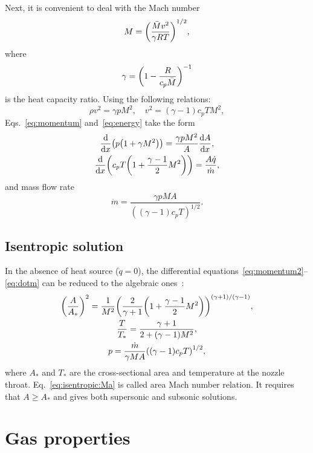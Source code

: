 \documentclass{article}
\begin{document}
Next, it is convenient to deal with the Mach number
\begin{equation}\label{eq:Mach}
    M = \qty(\frac{\bar{M}v^2}{\gamma RT})^{1/2},
\end{equation}
where
\begin{equation}\label{eq:gamma}
    \gamma = \qty(1-\frac{R}{c_p\bar{M}})^{-1}
\end{equation}
is the heat capacity ratio.
Using the following relations:
\begin{equation*}
    \rho v^2 = \gamma p M^2, \quad v^2 = (\gamma-1)c_pT M^2,
\end{equation*}
Eqs.~\eqref{eq:momentum} and~\eqref{eq:energy} take the form
\begin{gather}
    \dv{x}(p\qty(1 + \gamma M^2)) = \frac{\gamma p M^2}{A}\dv{A}{x}, \label{eq:momentum2}\\
    \dv{x}(c_pT\qty(1 + \frac{\gamma-1}{2}M^2)) = \frac{A\dot{q}}{\dot{m}}, \label{eq:energy2}
\end{gather}
and mass flow rate
\begin{equation}\label{eq:dotm}
    \dot{m} = \frac{\gamma pMA}{((\gamma-1)c_pT)^{1/2}}.
\end{equation}

\subsection{Isentropic solution}

In the absence of heat source ($\dot{q}=0$), the differential equations~\eqref{eq:momentum2}--\eqref{eq:dotm}
can be reduced to the algebraic ones~\cite[Sec.~5.4]{anderson1990modern}:
\begin{gather}
    \qty(\frac{A}{A_*})^2 = \frac1{M^2}
        \qty(\frac{2}{\gamma+1}\qty(1+\frac{\gamma-1}{2}M^2))^{(\gamma+1)/(\gamma-1)}, \label{eq:isentropic:Ma}\\
    \frac{T}{T_*} = \frac{\gamma+1}{2 + (\gamma-1)M^2}, \label{eq:isentropic:T}\\
    p = \frac{\dot{m}}{\gamma MA}\qty((\gamma-1)c_pT)^{1/2}, \label{eq:isentropic:P}
\end{gather}
where $A_*$ and $T_*$ are the cross-sectional area and temperature at the nozzle throat.
Eq.~\eqref{eq:isentropic:Ma} is called area Mach number relation.
It requires that $A\geq A_*$ and gives both supersonic and subsonic solutions.

\section{Gas properties}
\end{document}
